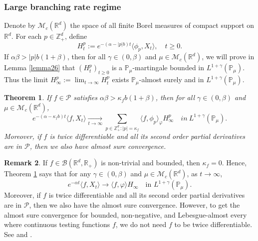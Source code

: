 \documentclass[12pt,a4paper]{amsart}
\theoremstyle{plain}
\newtheorem{thm}{Theorem}[section]
\theoremstyle{definition}
\newtheorem{rem}[thm]{Remark}
\numberwithin{equation}{section}
\begin{document}
\subsubsection{Large branching rate regime}
    Denote by $\mathcal M_c(\mathbb R^d)$ the space of all finite Borel measures of compact support on $\mathbb R^d$.
    For each $p\in \mathbb{Z}_+^d$, define
\[
    H_t^p
    := e^{-(\alpha-|p|b)t}\langle\phi_p,X_t\rangle,
    \quad t\geq 0.
\]
    If $\alpha\beta>|p|b(1+\beta)$, then for all $\gamma\in (0, \beta)$ and $\mu\in \mathcal M_c(\mathbb R^d)$,
      we will prove in Lemma \ref{lemma26} that $(H_t^p)_{t\geq 0}$ is a $\mathbb{P}_{\mu}$-martingale bounded in $L^{1+\gamma}(\mathbb{P}_{\mu})$.
    Thus the limit $H^p_{\infty}:=\lim_{t\rightarrow \infty}H_t^p$ exists $\mathbb{P}_{\mu}$-almost surely and in $L^{1+\gamma}(\mathbb{P}_{\mu})$.
 \begin{thm}
 \label{thm: law of large number}
     If $f \in \mathcal{P}$ satisfies $\alpha\beta>\kappa_fb(1+\beta)$, then
   for all
     $\gamma\in (0, \beta)$ and  $\mu\in \mathcal M_c(\mathbb R^d)$,
\[
    e^{-(\alpha-\kappa_fb)t}\langle f, X_t\rangle
       \xrightarrow[t\to \infty]{}\sum_{p\in \mathbb Z_+^d:|p|=\kappa_f}\langle f, \phi_p\rangle_{\varphi} H_{\infty}^p
    \quad in~ L^{1+\gamma}(\mathbb{P}_{\mu}).
\]
    Moreover, if $f$ is twice differentiable and all its second order partial derivatives are in $\mathcal{P}$, then we also have almost sure convergence.
\end{thm}
\begin{rem}
   If $f\in \mathcal B(\mathbb R^d, \mathbb R_+)$ is non-trivial and  bounded, then $\kappa_f=0$.
    Hence, Theorem \ref{thm: law of large number} says that
    for any $\gamma\in (0, \beta)$ and  $\mu\in \mathcal M_c(\mathbb R^d)$, as $t\rightarrow \infty$,
\[
    e^{-\alpha t}\langle f, X_t\rangle
    \rightarrow \langle f, \varphi\rangle H_{\infty}
    \quad \mbox{in } L^{1+\gamma}(\mathbb{P}_{\mu}).
\]
    Moreover, if $f$ is twice differentiable and all its second order partial derivatives are in $\mathcal{P}$, then we also have the almost sure convergence.
    However, to get the almost sure convergence for bounded, non-negative, and Lebesgue-almost every where continuous testing functions $f$, we do not need $f$ to be twice differentiable. See \cite[Theorem 2.13 \& Example 8.1]{ChenRenYang2019Skeleton} and \cite[Theorem 1.2 \& Example 4.1]{EckhoffKyprianouWinkel2015Spines}.
\end{rem}
\end{document}
